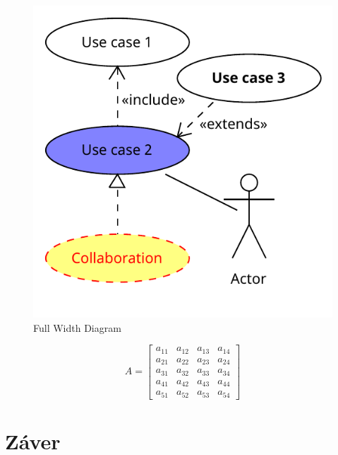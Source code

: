 \documentclass[10pt,twocolumn,twoside,slovak,a4paper]{article}
\begin{document}
\begin{figure}[htbp]
    \centering
    \includegraphics[width=\textwidth]{Diagrams/Diagram.pdf}
    \caption{Full Width Diagram}
    \label{fig:full_width_diagram}
\end{figure}

\begin{equation}
    A = \begin{bmatrix}
        a_{11} & a_{12} & a_{13} & a_{14} \\
        a_{21} & a_{22} & a_{23} & a_{24} \\
        a_{31} & a_{32} & a_{33} & a_{34} \\
        a_{41} & a_{42} & a_{43} & a_{44} \\
        a_{51} & a_{52} & a_{53} & a_{54}
    \end{bmatrix}
\end{equation}

\section{Záver} \label{zaver} %







\end{document}
